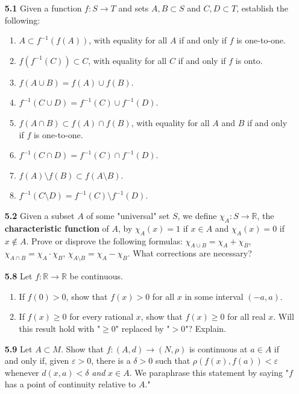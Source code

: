 \documentclass[12pt]{amsart}
\def\iff{if and only if }
\def\RR{{\mathbb R}}
\newcommand{\inv}[1]{#1^{-1}}
\renewcommand{\epsilon}{\varepsilon}
\begin{document}
\begin{enumerate}

\item[\bf 5.1] Given a function $f:S\to T$ and sets $A,B\subset S$ and $C,D\subset T$, establish the following: 
	\begin{enumerate}[label={\bf (\roman*)}]
	\item $A\subset f^{-1}\left(f(A)\right)$, with equality for all $A$ \iff $f$ is one-to-one.
	\medskip
	\item $f\left(f^{-1}(C)\right)\subset C$, with equality for all $C$ \iff $f$ is onto.
	\medskip
	\item $f(A\cup B)=f(A)\cup f(B)$.
	\medskip
	\item $\inv f(C\cup D)=\inv f(C)\cup \inv f(D)$.
	\medskip
	\item $f(A\cap B)\subset f(A)\cap f(B)$, with equality for all $A$ and $B$ if and only if $f$ is one-to-one.
	\medskip
	\item $\inv f(C\cap D)=\inv f(C)\cap \inv f(D)$.
	\medskip
	\item $f(A)\setminus f(B)\subset f(A\setminus B)$.
	\medskip
	\item $\inv f(C\setminus D)=\inv f(C) \setminus \inv f(D)$.
	\end{enumerate}

\bigskip

\item[\bf 5.2] Given a subset $A$ of some "universal" set $S$, we define $\chi_A : S\to \RR$, the {\bf characteristic function} of $A$, by $\chi_A(x)=1$ if $x\in A$ and $\chi_A(x)=0$ if $x\not\in A$. Prove or disprove the following formulas: $\chi_{A\cup B}=\chi_A+\chi_B$, $\chi_{A\cap B}=\chi_A\cdot\chi_B$, $\chi_{A\setminus B}=\chi_A-\chi_B$. What corrections are necessary? 

\bigskip

\item[\bf 5.8] Let $f:\RR\to\RR$ be continuous.
	\begin{enumerate}[label={\bf (\alph*)}]
	\item If $f(0)>0$, show that $f(x)>0$ for all $x$ in some interval $(-a, a)$.
	\medskip
	\item If $f(x)\geq 0$ for every rational $x$, show that $f(x)\geq 0$ for all real $x$. Will this result hold with "$\geq 0$" replaced by "$>0$"? Explain. 
	\end{enumerate}
	
\bigskip

\item[\bf 5.9] Let $A\subset M$. Show that $f:(A,d)\to(N,\rho)$ is continuous at $a\in A$ if and only if, given $\epsilon>0$, there is a $\delta>0$ such that $\rho(f(x),f(a))<\epsilon$ whenever $d(x, a)<\delta$ \textit{and} $x\in A$. We paraphrase this statement by saying "$f$ has a point of continuity relative to $A$."


\end{enumerate}
\end{document}
